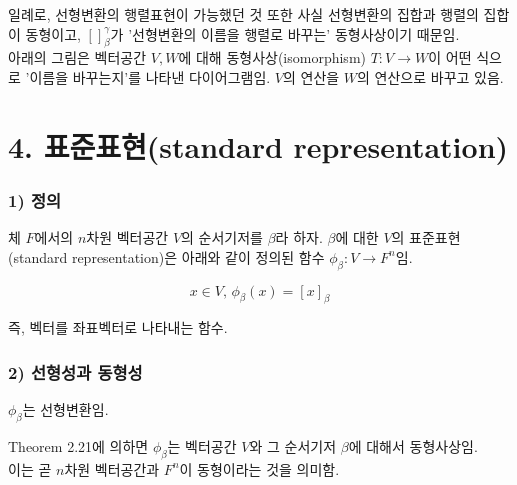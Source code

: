 일례로, 선형변환의 행렬표현이 가능했던 것 또한 사실 선형변환의 집합과 행렬의 집합이 동형이고, $[]_{\beta}^{\gamma}$가 '선형변환의 이름을 행렬로 바꾸는' 동형사상이기 때문임.\\

아래의 그림은 벡터공간 $V,W$에 대해 동형사상(isomorphism) $T:V \rightarrow W$이 어떤 식으로 '이름을 바꾸는지'를 나타낸 다이어그램임. $V$의 연산을 $W$의 연산으로 바꾸고 있음.



\section*{4. 표준표현(standard representation)}
\subsubsection*{1) 정의\\}
\begin{DEF}
체 $F$에서의 $n$차원 벡터공간 $V$의 순서기저를 $\beta$라 하자. $\beta$에 대한 $V$의 표준표현(standard representation)은 아래와 같이 정의된 함수 $\phi_{\beta}:V \rightarrow F^n$임.

\[
x \in V,\,\phi_{\beta}(x)=[x]_{\beta}
\]
\end{DEF}

즉, 벡터를 좌표벡터로 나타내는 함수.

\subsubsection*{2) 선형성과 동형성}
$\phi_{\beta}$는 선형변환임.

Theorem 2.21에 의하면 $\phi_{\beta}$는 벡터공간 $V$와 그 순서기저 $\beta$에 대해서 동형사상임.\\
이는 곧 $n$차원 벡터공간과 $F^n$이 동형이라는 것을 의미함.


\newpage


